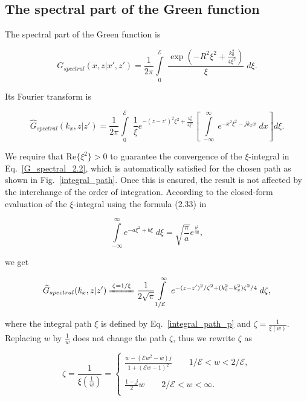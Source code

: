 \documentclass[preprint,12pt]{elsarticle}
\begin{document}
\subsection{The spectral part of the Green function}
The spectral part of the Green function is
\begin{small}
\begin{equation}
G_{spectral}(x,z|x',z') = \frac{1}{2\pi} \int \limits^{\mathcal{E}}_0 
\;\frac{\exp \left( -R^2\xi^2 + \frac{k^2_0}{4\xi^2} \right)}{\xi} \; d\xi .
\label{G_spectral_2.2}
\end{equation}
\end{small}
Its Fourier transform is 
\begin{small}
\begin{equation}
\label{G_spectral_original}
\widehat{G}_{spectral}(k_x,z|z')
= \frac{1}{2\pi} \int \limits^{\mathcal{E}}_0  \;\frac{1}{\xi} e^{-(z-z')^2\xi^2 + \frac{k_0^2}{4\xi^2}} \left[  \; \int \limits^{\infty}_{-\infty} \; e^{-x^2 \xi^2 - jk_x x} \; dx\right] d\xi.
\end{equation}
\end{small}
We require that $\mathrm{Re}\{\xi^2\} > 0$ to guarantee the convergence of the $\xi$-integral in Eq.~\eqref{G_spectral_2.2}, which is automatically satisfied for the chosen path as shown in Fig.~\ref{integral_path}. Once this is ensured, the result is not affected by the interchange of the order of integration. According to  the closed-form evaluation of the $\xi$-integral using the formula (2.33) in \cite{2014Table}
\begin{small}
 \begin{equation}
\int \limits^{\infty}_{-\infty} e^{-a\xi^2 + b\xi}\; d\xi = \sqrt{\frac{\pi}{a}}e^{\frac{b^2}{4a}},
 \label{xi_integral}
 \end{equation}
 \end{small}
 we get
 \begin{small}
\begin{equation}
\widehat{G}_{spectral}(k_x,z|z') \xlongequal{\zeta = 1/\xi} \frac{1}{2\sqrt{\pi}}\int \limits^{\infty}_{1/\mathcal{E}} \;  e^{-(z-z')^2/\zeta^2+ (k_0^2 - k_x^2)\zeta^2/4} \; d\zeta ,
\end{equation}
\end{small}
where the integral path $\xi$ is defined by Eq.~\eqref{integral_path_p} and
$ \zeta = \frac{1}{\xi(w)}$. Replacing $w$ by $\frac{1}{w}$ does not change the path $\zeta$, thus we rewrite $\zeta$ as
\begin{small}
\begin{equation}
\zeta 
=\frac{1}{\xi(\frac{1}{w}) } 
=
 \left\{ \begin{array}{ll}
\frac{w - (\mathcal{E}w^2 -w)j}{1 + (\mathcal{E}w - 1)^2} \qquad {1}/\mathcal{E} < w < {2}/\mathcal{E}, \\
\\
\frac{1-j}{2} w \qquad {2}/{\mathcal{E}} < w < \infty .\\
\end{array}\right.  
\label{integral_path_q}
\end{equation}
\end{small}
\end{document}
